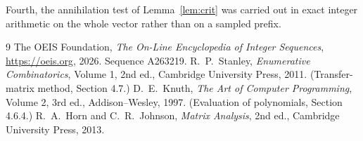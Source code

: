 \documentclass[11pt,a4paper]{article}
\theoremstyle{plain}
\theoremstyle{definition}
\begin{document}
Fourth, the annihilation test of Lemma~\ref{lem:crit} was carried out in exact integer
arithmetic on the whole vector rather than on a sampled prefix.

\begin{thebibliography}{9}
 The OEIS Foundation, \emph{The On-Line Encyclopedia of Integer
Sequences}, \url{https://oeis.org}, 2026. Sequence A263219.
 R.~P.~Stanley, \emph{Enumerative Combinatorics}, Volume 1, 2nd ed.,
Cambridge University Press, 2011. (Transfer-matrix method, Section 4.7.)
 D.~E.~Knuth, \emph{The Art of Computer Programming}, Volume 2, 3rd ed.,
Addison--Wesley, 1997. (Evaluation of polynomials, Section 4.6.4.)
 R.~A.~Horn and C.~R.~Johnson, \emph{Matrix Analysis}, 2nd ed., Cambridge
University Press, 2013.
\end{thebibliography}
\end{document}
